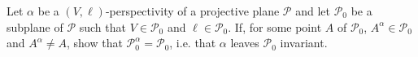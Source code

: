 Let $\alpha$ be a $(V,\ell)$-perspectivity of a projective plane $\mathcal{P}$ and let $\mathcal{P}_0$ be a subplane of $\mathcal{P}$ such that $V \in \mathcal{P}_0$ and $\ell \in \mathcal{P}_0$. If, for some point $A$ of $\mathcal{P}_0$, $A^\alpha \in \mathcal{P}_0$ and $A^\alpha \neq A$, show that $\mathcal{P}_0^\alpha = \mathcal{P}_0$, i.e. that $\alpha$ leaves $\mathcal{P}_0$ invariant.
